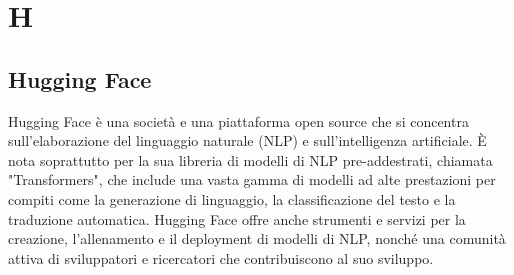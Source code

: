 \section{H}

\vspace{2em}
\subsection*{Hugging Face}
Hugging Face è una società e una piattaforma open source che si concentra sull'elaborazione del linguaggio naturale (NLP) e sull'intelligenza artificiale. È nota soprattutto per la sua libreria di modelli di NLP pre-addestrati, chiamata "Transformers", che include una vasta gamma di modelli ad alte prestazioni per compiti come la generazione di linguaggio, la classificazione del testo e la traduzione automatica. Hugging Face offre anche strumenti e servizi per la creazione, l'allenamento e il deployment di modelli di NLP, nonché una comunità attiva di sviluppatori e ricercatori che contribuiscono al suo sviluppo.
